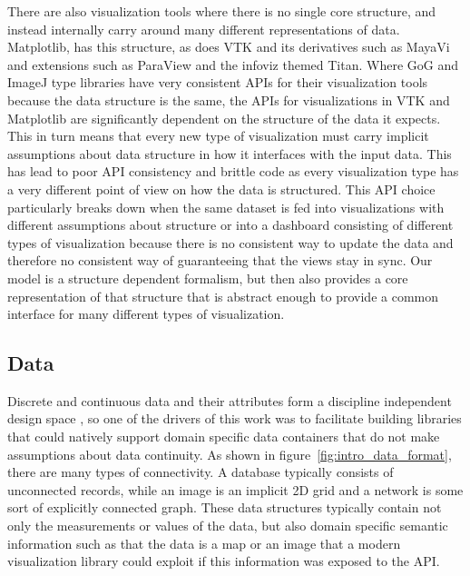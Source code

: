 \documentclass[../main.tex]{subfiles}
\begin{document}
There are also visualization tools where there is no single core structure, and instead internally carry around many different representations of data. Matplotlib, has this structure, as does VTK \cite{hanwellVisualizationToolkitVTK2015,geveci2012vtk} and its derivatives such as MayaVi\cite{RamachandranMayaVI2011} and extensions such as ParaView\cite{ahrens2005paraview} and the infoviz themed Titan\cite{brianwylieUnifiedToolkitInformation2009}. Where GoG and ImageJ type libraries have very consistent APIs for their visualization tools because the data structure is the same, the APIs for visualizations in VTK and Matplotlib are significantly dependent on the structure of the data it expects. This in turn means that every new type of visualization must carry implicit assumptions about data structure in how it interfaces with the input data. This has lead to poor API consistency and brittle code as every visualization type has a very different point of view on how the data is structured. This API choice particularly breaks down when the same dataset is fed into visualizations with different assumptions about structure or into a dashboard consisting of different types of visualization\cite{a.sarikayaWhatWeTalk2019,fewDashboardConfusionRevisited2007} because there is no consistent way to update the data and therefore no consistent way of guaranteeing that the views stay in sync. Our model is a structure dependent formalism, but then also provides a core representation of that structure that is abstract enough to provide a common interface for many different types of visualization.

\subsection{Data}
\label{sec:intro_data}
Discrete and continuous data and their attributes form a discipline independent design space \cite{pousmanCasualInformation2007}, so one of the drivers of this work was to facilitate building libraries that could natively support domain specific data containers that do not make assumptions about data continuity. As shown in figure~\ref{fig:intro_data_format}, there are many types of connectivity. A database typically consists of unconnected records, while an image is an implicit 2D grid and a network is some sort of explicitly connected graph. These data structures typically contain not only the measurements or values of the data, but also domain specific semantic information such as that the data is a map or an image that a modern visualization library could exploit if this information was exposed to the API. 
\end{document}
